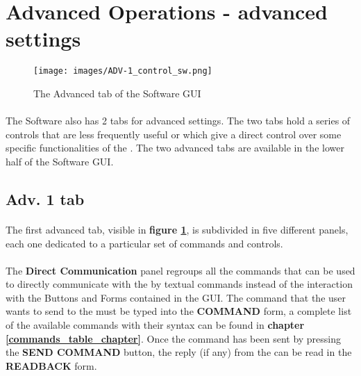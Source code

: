 \section{Advanced Operations - \QubeModel advanced settings}
\begin{figure}[h]
    \centering
    \texttt{[image: images/ADV-1\_control\_sw.png]}
    \caption{The Advanced tab of the \SoftwareType Software GUI}
    \label{ADV1_SW_interface}
\end{figure}

\paragraph{} The \SoftwareType Software also has 2 tabs for advanced settings. The two tabs hold a series of controls that are less frequently useful or which give a direct control over some specific functionalities of the \QubeModel. The two advanced tabs are available in the lower half of the  \SoftwareType Software GUI.





\subsection{Adv. 1 tab}
\paragraph{} The first advanced tab, visible in \textbf{figure \ref{ADV1_SW_interface}}, is subdivided in five different panels, each one dedicated to a particular set of commands and controls.

\paragraph{} The \textbf{Direct Communication} panel regroups all the commands that can be used to directly communicate with the \QubeModel  by textual commands instead of the interaction with the Buttons and Forms contained in the GUI.
\newline The command that the user wants to send to the \QubeModel  must be typed into the \textbf{COMMAND} form, a complete list of the available commands with their syntax can be found in \textbf{chapter \ref{commands_table_chapter}}.
\newline Once the command has been sent by pressing the \textbf{SEND COMMAND} button, the reply (if any) from the \QubeModel  can be read in the \textbf{READBACK} form.

